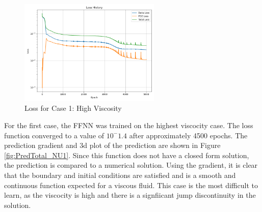 \documentclass[11pt]{article}
\begin{document}
\begin{figure}[h]
    \centering
    \includegraphics[width=0.6\textwidth]{1D_Loss_NU1.png}
    \caption{Loss for Case 1: High Viscosity}
    \label{fig:Loss_NU1}
\end{figure}

For the first case, the FFNN was trained on the highest viscocity case. The loss function converged to a value of $10^-1.4$ after approximately 4500 epochs. The prediction gradient and 3d plot of the prediction are shown in Figure \ref{fig:PredTotal_NU1}. Since this function does not have a closed form solution, the prediction is compared to a numerical solution. Using the gradient, it is clear that the boundary and initial conditions are satisfied and is a smooth and continuous function expected for a viscous fluid. This case is the most difficult to learn, as the viscocity is high and there is a signfiicant jump discontinuity in the solution.

\pagebreak
\end{document}
